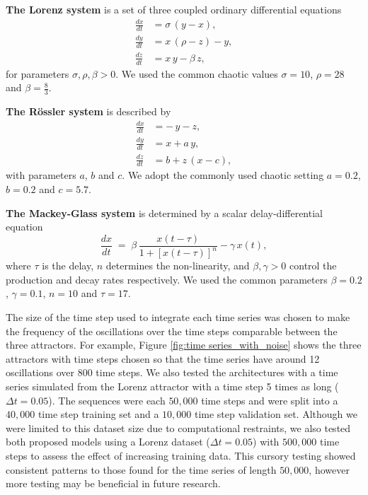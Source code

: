 %
%

\noindent\textbf{The Lorenz system} is a set of three coupled ordinary differential equations
\begin{equation*}
  \begin{aligned}
    \frac{dx}{dt} &= \sigma\,(y-x),\\
    \frac{dy}{dt} &= x\,(\rho-z) - y,\\
    \frac{dz}{dt} &= x\,y - \beta\,z,
  \end{aligned}
  \label{eq:lorenz}
\end{equation*}
for parameters $\sigma, \rho, \beta > 0$.
We used the common chaotic values
$\sigma = 10$, $\rho = 28$ and $\beta = \tfrac{8}{3}$.

\noindent\textbf{The R\"ossler system} is described by
\begin{equation*}
  \begin{aligned}
    \frac{dx}{dt} &= -\,y - z,\\
    \frac{dy}{dt} &= x + a\,y,\\
    \frac{dz}{dt} &= b + z\,(x-c),
  \end{aligned}
  \label{eq:rossler}
\end{equation*}
with parameters $a$, $b$ and $c$.  We adopt the commonly used chaotic
setting $a = 0.2$, $b = 0.2$ and $c = 5.7$.

\noindent\textbf{The Mackey-Glass system} is determined by a scalar delay-differential equation
\begin{equation*}
  \frac{dx}{dt} \;=\;
  \beta\,\frac{x(t-\tau)}{1 + [x(t-\tau)]^{n}} - \gamma\,x(t),
  \label{eq:mackey-glass}
\end{equation*}
where $\tau$ is the delay, $n$ determines the non-linearity, and
$\beta,\gamma>0$ control the production and decay rates respectively.
We used the common parameters $\beta = 0.2$, $\gamma = 0.1$, $n = 10$ and $\tau = 17$.


The size of the time step used to integrate each time series was chosen to make the frequency of the oscillations over the time steps comparable between the three attractors. For example, Figure \ref{fig:time series_with_noise} shows the three attractors with time steps chosen so that the time series have around 12 oscillations over 800 time steps. We also tested the architectures with a time series simulated from the Lorenz attractor with a time step 5 times as long ($\Delta t=0.05$). The sequences were each $50,000$ time steps and were split into a $40,000$ time step training set and a $10,000$ time step validation set. Although we were limited to this dataset size due to computational restraints, we also tested both proposed models using a Lorenz dataset ($\Delta t=0.05$) with $500,000$ time steps to assess the effect of increasing training data. This cursory testing showed consistent patterns to those found for the time series of length $50,000$, however more testing may be beneficial in future research.

